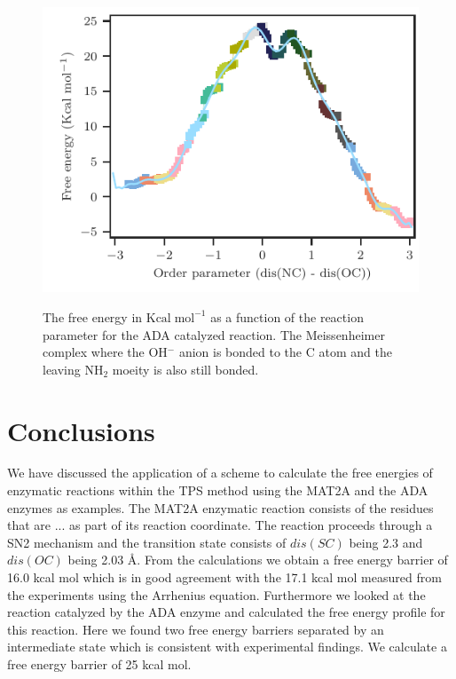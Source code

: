 \documentclass[journal=jpcbfk,manuscript=article,layout=traditional]{achemso}
\begin{document}
\begin{figure}[ht!]
\includegraphics[scale=1.0]{./figures/ada-fenergy.pdf}
\label{fig:ada-fenergy}
\caption{The free energy in $\text{Kcal}\;\text{mol}^{-1}$ as a function of the reaction 
parameter for the ADA catalyzed reaction. The Meissenheimer complex where the OH$^{-}$ anion
is bonded to the C atom and the leaving NH$_2$ moeity is also still bonded.}
\end{figure}

\section{Conclusions}
We have discussed the application of a scheme to calculate the 
free energies of enzymatic reactions within the TPS method using the MAT2A
and the ADA enzymes as examples. The MAT2A enzymatic reaction consists of 
the residues that are ... as part of its reaction coordinate. The reaction 
proceeds through a SN2 mechanism and the transition state consists of 
$dis(SC)$ being 2.3 and $dis(OC)$ being 2.03 {\AA}. From the calculations 
we obtain a free energy barrier of 16.0 kcal mol which is in good agreement 
with the 17.1 kcal mol measured from the experiments using the Arrhenius equation.
Furthermore we looked at the reaction catalyzed by the ADA enzyme and 
calculated the free energy profile for this reaction. Here we found two free energy
barriers separated by an intermediate state which is consistent with 
experimental findings. We calculate a free energy barrier of 25 kcal mol.  
\end{document}
